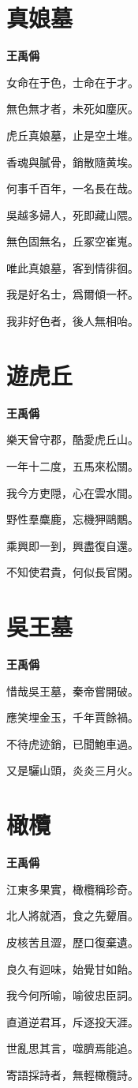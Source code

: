 \documentclass[12pt,a4paper]{ctexbook}
\begin{document}
\section{真娘墓}
\textbf{王禹偁}\par\vspace{0.5em}
女命在于色，士命在于才。\par
無色無才者，未死如塵灰。\par
虎丘真娘墓，止是空土堆。\par
香魂與膩骨，銷散隨黄埃。\par
何事千百年，一名長在哉。\par
吳越多婦人，死即藏山隈。\par
無色固無名，丘冢空崔嵬。\par
唯此真娘墓，客到情徘徊。\par
我是好名士，爲爾傾一杯。\par
我非好色者，後人無相咍。\par

\section{遊虎丘}
\textbf{王禹偁}\par\vspace{0.5em}
樂天曾守郡，酷愛虎丘山。\par
一年十二度，五馬來松關。\par
我今方吏隠，心在雲水間。\par
野性羣麋鹿，忘機狎鷗鷳。\par
乘興即一到，興盡復自還。\par
不知使君貴，何似長官閑。\par

\section{吳王墓}
\textbf{王禹偁}\par\vspace{0.5em}
惜哉吳王墓，秦帝嘗開破。\par
應笑埋金玉，千年賈餘禍。\par
不待虎迹銷，已聞鮑車過。\par
又是驪山頭，炎炎三月火。\par

\section{橄欖}
\textbf{王禹偁}\par\vspace{0.5em}
江東多果實，橄欖稱珍奇。\par
北人將就酒，食之先顰眉。\par
皮核苦且澀，歷口復棄遺。\par
良久有迴味，始覺甘如飴。\par
我今何所喻，喻彼忠臣詞。\par
直道逆君耳，斥逐投天涯。\par
世亂思其言，噬臍焉能追。\par
寄語採詩者，無輕橄欖詩。\par
\end{document}
